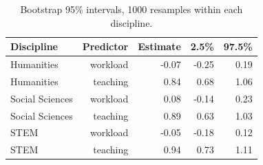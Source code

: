 \begin{table}[h]
  \centering
  \caption{Bootstrap 95\% intervals, 1000 resamples within each discipline.}
  \label{tab:ci}
\begin{tabular}{lrrrr}
\toprule
Discipline & Predictor & Estimate & 2.5\% & 97.5\% \\
\midrule
Humanities & workload & -0.07 & -0.25 & 0.19 \\
Humanities & teaching & 0.84 & 0.68 & 1.06 \\
Social Sciences & workload & 0.08 & -0.14 & 0.23 \\
Social Sciences & teaching & 0.89 & 0.63 & 1.03 \\
STEM & workload & -0.05 & -0.18 & 0.12 \\
STEM & teaching & 0.94 & 0.73 & 1.11 \\
\bottomrule
\end{tabular}
\end{table}
